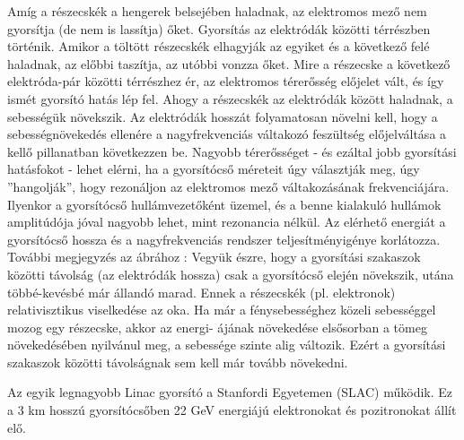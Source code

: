 \documentclass[../main.tex]{subfiles}
\begin{document}
Amíg a részecskék a hengerek belsejében haladnak, az elektromos mező nem gyorsítja
(de nem is lassítja) őket. Gyorsítás az elektródák közötti térrészben történik. Amikor a
töltött részecskék elhagyják az egyiket és a következő felé haladnak, az előbbi taszítja, az
utóbbi vonzza őket. Mire a részecske a következő elektróda-pár közötti térrészhez ér, az
elektromos térerősség előjelet vált, és így ismét gyorsító hatás lép fel. Ahogy a részecskék
az elektródák között haladnak, a sebességük növekszik. Az elektródák hosszát folyamatosan növelni kell, hogy a sebességnövekedés ellenére a nagyfrekvenciás váltakozó feszültség
előjelváltása a kellő pillanatban következzen be. Nagyobb térerősséget - és ezáltal jobb
gyorsítási hatásfokot - lehet elérni, ha a gyorsítócső méreteit úgy választják meg, úgy
”hangolják”, hogy rezonáljon az elektromos mező váltakozásának frekvenciájára. Ilyenkor a gyorsítócső hullámvezetőként üzemel, és a benne kialakuló hullámok amplitúdója
jóval nagyobb lehet, mint rezonancia nélkül. Az elérhető energiát a gyorsítócső hossza
és a nagyfrekvenciás rendszer teljesítményigénye korlátozza.
További megjegyzés az ábrához : Vegyük észre, hogy a gyorsítási szakaszok közötti
távolság (az elektródák hossza) csak a gyorsítócső elején növekszik, utána többé-kevésbé
már állandó marad. Ennek a részecskék (pl. elektronok) relativisztikus viselkedése az
oka. Ha már a fénysebességhez közeli sebességgel mozog egy részecske, akkor az energi-
ájának növekedése elsősorban a tömeg növekedésében nyilvánul meg, a sebessége szinte
alig változik. Ezért a gyorsítási szakaszok közötti távolságnak sem kell már tovább növekedni.

Az egyik legnagyobb Linac gyorsító a Stanfordi Egyetemen (SLAC) működik. Ez a
3 km hosszú gyorsítócsőben 22 GeV energiájú elektronokat és pozitronokat állít elő.
\end{document}
